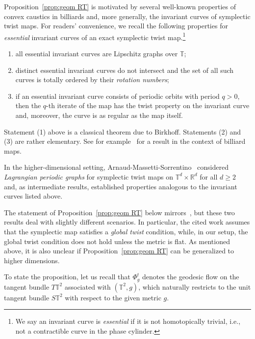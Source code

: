 \documentclass[11pt,letterpaper,oneside]{amsart}
\newcommand{\R}{\mathbb{R}}
\newcommand{\T}{\mathbb{T}}
\theoremstyle{definition}
\theoremstyle{remark}
\theoremstyle{definition}
\theoremstyle{remark}
\begin{document}
Proposition~\ref{prop:geom RT} is motivated by several well-known properties of convex caustics in billiards and, more generally, the invariant curves of symplectic twist maps.
For readers' convenience, we recall the following properties for \emph{essential} invariant curves of an exact symplectic twist map.\footnote{We say an invariant curve is \emph{essential} if it is not homotopically trivial, i.e., not a contractible curve in the phase cylinder.}
\begin{enumerate}
    \item all essential invariant curves are Lipschitz graphs over $\T$;
    \item distinct essential invariant curves do not intersect and the set of all such curves is totally ordered by their \emph{rotation numbers};
    \item if an essential invariant curve consists of periodic orbits with period $q > 0$, then the $q$-th iterate of the map has the twist property on the invariant curve and, moreover, the curve is as regular as the map itself.
\end{enumerate}
Statement (1) above is a classical theorem due to Birkhoff. 
Statements (2) and (3) are rather elementary.
See for example~\cite[Lemma 2.1]{PINTO-DE-CARVALHO_RAMIREZ-ROS_2013} for a result in the context of billiard maps.

\medskip

In the higher-dimensional setting, Arnaud-Massetti-Sorrentino~\cite{ArnaudMassettiSorrentino2023} considered \emph{Lagrangian periodic graphs} for symplectic twist maps on $\T^d \times \R^d$ for all $d \geq 2$ and, as intermediate results, established properties analogous to the invariant curves listed above.

\medskip

The statement of Proposition~\ref{prop:geom RT} below mirrors~\cite[Section 2]{ArnaudMassettiSorrentino2023}, but these two results deal with slightly different scenarios.
In particular, the cited work assumes that the symplectic map satisfies a \emph{global twist} condition, while, in our setup, the global twist condition does not hold unless the metric is flat.
As mentioned above, it is also unclear if Proposition~\ref{prop:geom RT} can be generalized to higher dimensions.

\medskip

To state the proposition, let us recall that $\Phi^t_g$ denotes the geodesic flow on the tangent bundle $T\T^2$ associated with $(\T^2, g)$, which naturally restricts to the unit tangent bundle $S\T^2$ with respect to the given metric $g$.
\end{document}

